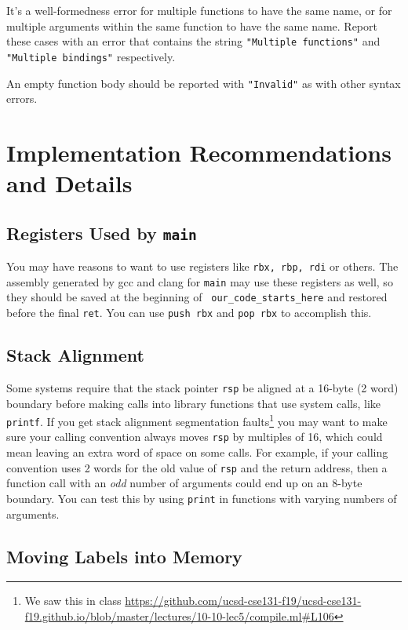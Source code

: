 \documentclass[10pt, oneside]{article}
\begin{document}
It's a well-formedness error for multiple functions to have the same name, or
for multiple arguments within the same function to have the same name. Report
these cases with an error that contains the string {\tt "Multiple functions"}
and {\tt "Multiple bindings"} respectively.

An empty function body should be reported with {\tt "Invalid"} as with other
syntax errors.

\section*{Implementation Recommendations and Details}

\subsection*{Registers Used by {\tt main}}

You may have reasons to want to use registers like {\tt rbx, rbp, rdi} or
others. The assembly generated by gcc and clang for {\tt main} may use these
registers as well, so they should be saved at the beginning of {\tt
our\_code\_starts\_here} and restored before the final {\tt ret}. You can use
{\tt push rbx} and {\tt pop rbx} to accomplish this.

\subsection*{Stack Alignment}

Some systems require that the stack pointer {\tt rsp} be aligned at a 16-byte
(2 word) boundary before making calls into library functions that use system
calls, like {\tt printf}. If you get stack alignment segmentation
faults\footnote{We saw this in class
\url{https://github.com/ucsd-cse131-f19/ucsd-cse131-f19.github.io/blob/master/lectures/10-10-lec5/compile.ml\#L106}}
you may want to make sure your calling convention always moves {\tt rsp} by
multiples of 16, which could mean leaving an extra word of space on some
calls. For example, if your calling convention uses 2 words for the old value
of {\tt rsp} and the return address, then a function call with an {\it odd}
number of arguments could end up on an 8-byte boundary. You can test this by
using {\tt print} in functions with varying numbers of arguments.

\subsection*{Moving Labels into Memory}
\end{document}
